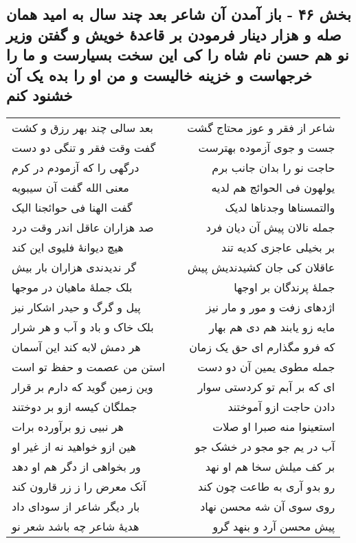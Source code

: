 \begin{center}
\section*{بخش ۴۶ - باز آمدن آن شاعر بعد چند سال به امید همان صله و هزار دینار فرمودن بر قاعدهٔ خویش و گفتن وزیر نو هم حسن نام شاه را کی این سخت بسیارست و ما را خرجهاست و خزینه خالیست و من او را بده یک آن خشنود کنم}
\label{sec:sh046}
\begin{longtable}{l p{0.5cm} r}
بعد سالی چند بهر رزق و کشت
&&
شاعر از فقر و عوز محتاج گشت
\\
گفت وقت فقر و تنگی دو دست
&&
جست و جوی آزموده بهترست
\\
درگهی را که آزمودم در کرم
&&
حاجت نو را بدان جانب برم
\\
معنی الله گفت آن سیبویه
&&
یولهون فی الحوائج هم لدیه
\\
گفت الهنا فی حوائجنا الیک
&&
والتمسناها وجدناها لدیک
\\
صد هزاران عاقل اندر وقت درد
&&
جمله نالان پیش آن دیان فرد
\\
هیچ دیوانهٔ فلیوی این کند
&&
بر بخیلی عاجزی کدیه تند
\\
گر ندیدندی هزاران بار بیش
&&
عاقلان کی جان کشیدندیش پیش
\\
بلک جملهٔ ماهیان در موجها
&&
جملهٔ پرندگان بر اوجها
\\
پیل و گرگ و حیدر اشکار نیز
&&
اژدهای زفت و مور و مار نیز
\\
بلک خاک و باد و آب و هر شرار
&&
مایه زو یابند هم دی هم بهار
\\
هر دمش لابه کند این آسمان
&&
که فرو مگذارم ای حق یک زمان
\\
استن من عصمت و حفظ تو است
&&
جمله مطوی یمین آن دو دست
\\
وین زمین گوید که دارم بر قرار
&&
ای که بر آبم تو کردستی سوار
\\
جملگان کیسه ازو بر دوختند
&&
دادن حاجت ازو آموختند
\\
هر نبیی زو برآورده برات
&&
استعینوا منه صبرا او صلات
\\
هین ازو خواهید نه از غیر او
&&
آب در یم جو مجو در خشک جو
\\
ور بخواهی از دگر هم او دهد
&&
بر کف میلش سخا هم او نهد
\\
آنک معرض را ز زر قارون کند
&&
رو بدو آری به طاعت چون کند
\\
بار دیگر شاعر از سودای داد
&&
روی سوی آن شه محسن نهاد
\\
هدیهٔ شاعر چه باشد شعر نو
&&
پیش محسن آرد و بنهد گرو
\\

\end{longtable}
\end{center}
